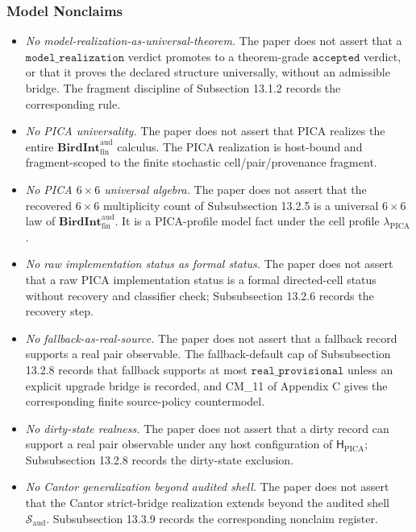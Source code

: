\documentclass[11pt]{article}
\providecommand{\tightlist}{}
\theoremstyle{definition}
\begin{document}
\subsubsection{Model Nonclaims}

\begin{itemize}
\tightlist
\item
  \emph{No model-realization-as-universal-theorem.} The paper does not assert that a \(\texttt{model\_realization}\) verdict promotes to a theorem-grade \(\texttt{accepted}\) verdict, or that it proves the declared structure universally, without an admissible bridge. The fragment discipline of Subsection 13.1.2 records the corresponding rule.
\item
  \emph{No PICA universality.} The paper does not assert that PICA realizes the entire \(\mathbf{BirdInt}^{\mathrm{aud}}_{\mathrm{fin}}\) calculus. The PICA realization is host-bound and fragment-scoped to the finite stochastic cell/pair/provenance fragment.
\item
  \emph{No PICA \(6\times 6\) universal algebra.} The paper does not assert that the recovered \(6\times 6\) multiplicity count of Subsubsection 13.2.5 is a universal \(6\times 6\) law of \(\mathbf{BirdInt}^{\mathrm{aud}}_{\mathrm{fin}}\). It is a PICA-profile model fact under the cell profile \(\lambda_{\mathrm{PICA}}\).
\item
  \emph{No raw implementation status as formal status.} The paper does not assert that a raw PICA implementation status is a formal directed-cell status without recovery and classifier check; Subsubsection 13.2.6 records the recovery step.
\item
  \emph{No fallback-as-real-source.} The paper does not assert that a fallback record supports a real pair observable. The fallback-default cap of Subsubsection 13.2.8 records that fallback supports at most \(\texttt{real\_provisional}\) unless an explicit upgrade bridge is recorded, and CM\_11 of Appendix C gives the corresponding finite source-policy countermodel.
\item
  \emph{No dirty-state realness.} The paper does not assert that a dirty record can support a real pair observable under any host configuration of \(\mathsf H_{\mathrm{PICA}}\); Subsubsection 13.2.8 records the dirty-state exclusion.
\item
  \emph{No Cantor generalization beyond audited shell.} The paper does not assert that the Cantor strict-bridge realization extends beyond the audited shell \(\mathcal S_{\mathrm{aud}}\). Subsubsection 13.3.9 records the corresponding nonclaim register.

\end{itemize}
\end{document}
